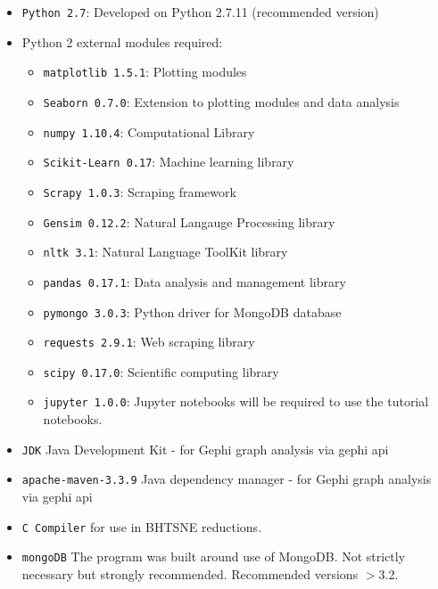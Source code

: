 \begin{itemize}
\itemsep-.6em
\item \texttt{Python 2.7}: Developed on Python 2.7.11 (recommended version)
\item Python 2 external modules required:
	\begin{itemize}
	\itemsep-.6em
	\item \texttt{matplotlib 1.5.1}: Plotting modules \cite{matplotlib}
	\item \texttt{Seaborn 0.7.0}: Extension to plotting modules and data analysis \cite{seaborn}
    \item \texttt{numpy 1.10.4}: Computational Library	 \cite{numpy}
	\item \texttt{Scikit-Learn 0.17}: Machine learning library \cite{scikitlearn}
	\item \texttt{Scrapy 1.0.3}: Scraping framework
	\item \texttt{Gensim 0.12.2}: Natural Langauge Processing library \cite{gensim}
	\item \texttt{nltk 3.1}: Natural Language ToolKit library \cite{nltk}
	\item \texttt{pandas 0.17.1}: Data analysis and management library \cite{pandas}
	\item \texttt{pymongo 3.0.3}: Python driver for MongoDB database 
    \item \texttt{requests 2.9.1}: Web scraping library 
    \item \texttt{scipy 0.17.0}: Scientific computing library \cite{scipy}
	\item \texttt{jupyter 1.0.0}: Jupyter notebooks will be required to use the tutorial notebooks\cite{jupyter}.
    \end{itemize}
\end{itemize}
\newpage
\null
\newpage
\begin{itemize}
\item \texttt{JDK} Java Development Kit - for Gephi graph analysis via gephi api
\item \texttt{apache-maven-3.3.9} Java dependency manager - for Gephi graph analysis via gephi api
\item \texttt{C Compiler} for use in BHTSNE reductions\cite{bhtsne}.
\item \texttt{mongoDB} The program was built around use of MongoDB. Not strictly necessary but strongly recommended. Recommended versions $>$3.2.
\end{itemize}  
